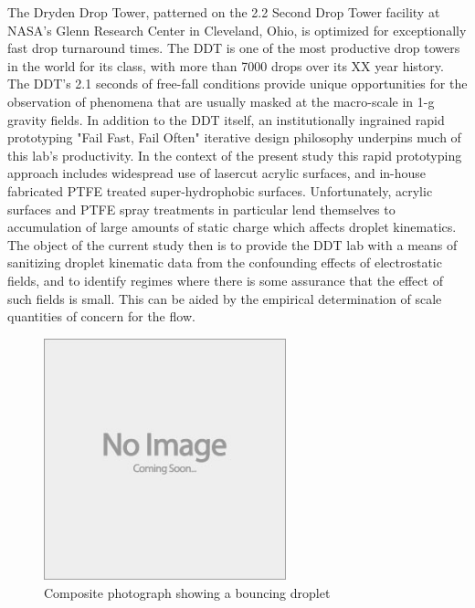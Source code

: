 \documentclass{jfm}
\begin{document}
The Dryden Drop Tower, patterned on the 2.2 Second Drop Tower facility at NASA's Glenn Research Center in Cleveland, Ohio, is optimized for exceptionally fast drop turnaround times. The DDT is one of the most productive drop towers in the world for its class, with more than 7000 drops over its XX year history. The DDT's 2.1 seconds of free-fall conditions provide unique opportunities for the observation of phenomena that are usually masked at the macro-scale in 1-g gravity fields. In addition to the DDT itself, an institutionally ingrained rapid prototyping "Fail Fast, Fail Often" iterative design philosophy underpins much of this lab's productivity. In the context of the present study this rapid prototyping approach includes widespread use of lasercut acrylic surfaces, and in-house fabricated PTFE treated super-hydrophobic surfaces. Unfortunately, acrylic surfaces and PTFE spray treatments in particular lend themselves to accumulation of large amounts of static charge which affects droplet kinematics. The object of the current study then is to provide the DDT lab with a means of sanitizing droplet kinematic data from the confounding effects of electrostatic fields, and to identify regimes where there is some assurance that the effect of such fields is small. This can be aided by the empirical determination of scale quantities of concern for the flow.



\begin{figure}
  \centerline{\includegraphics[height=7cm,width=7cm]{e88_1_thumb.jpg}}
  \caption{Composite photograph showing a bouncing droplet}
\label{fig:comp}
\end{figure}
\end{document}
